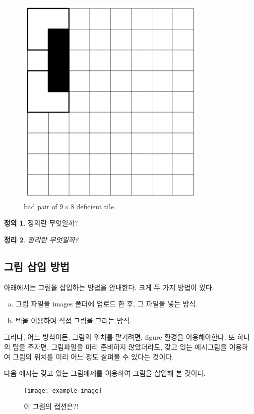 \documentclass[10pt]{oblivoir}
\newtheorem{theorem}{\bfseries\sffamily 정리}[section]
\theoremstyle{definition}
\newtheorem{definition}[theorem]{정의}
\theoremstyle{remark}
\numberwithin{equation}{section}
\begin{document}
\jiwon[6-7] %


\begin{figure}[!ht] %
    \centering
    \includegraphics[width=.15\textwidth]{images/B(8, 9).png} %
    \caption{bad pair of $9\times 8$ deficient tile} %
    \label{fig:my_label} %
\end{figure}

\begin{definition}
정의란 무엇일까? \citep{aanjaneya2009tromino, golomb2021polyominoes, nitica2017tilings} %
\end{definition}

\jiwon[3-4] %

\begin{theorem}\label{thm:what}
    정리란 무엇일까?
\end{theorem}



\subsection{그림 삽입 방법}

아래에서는 그림을 삽입하는 방법을 안내한다. 크게 두 가지 방법이 있다.
\begin{enumerate}[(a)]
    \item 그림 파일을 images 폴더에 업로드 한 후, 그 파일을 넣는 방식.
    \item 텍을 이용하여 직접 그림을 그리는 방식.
\end{enumerate}
그러나, 어느 방식이든, 그림의 위치를  맡기려면, figure 환경을 이용해야한다. 또 하나의 팁을 주자면, 그림파일을 미리 준비하지 않았더라도,  갖고 있는 예시그림을 이용하여 그림의 위치를 미리 어느 정도 살펴볼 수 있다는 것이다. 

다음 예시는  갖고 있는 그림예제를 이용하여 그림을 삽입해 본 것이다.

\begin{figure}[!ht]
    \centering
    \texttt{[image: example-image]} %
    \caption{이 그림의 캡션은?!}
    \label{fig:my_fig_label}
\end{figure}
\end{document}
